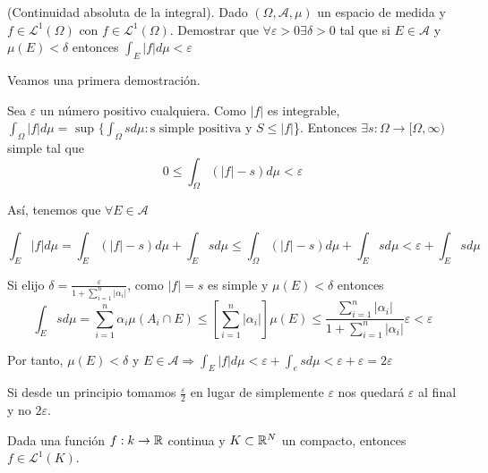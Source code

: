 \begin{ejer}
  (Continuidad absoluta de la integral). Dado $(\Omega, \mathcal A, \mu)$ un espacio de medida y $f \in \mathcal
  L^1(\Omega)$ con $f \in \mathcal L^1(\Omega)$. Demostrar que $\forall \varepsilon
  > 0 \exists \delta > 0$ tal que si $E \in \mathcal A$ y $\mu(E) < \delta$
  entonces $\int_E |f|d\mu < \varepsilon$
\end{ejer}

  \begin{sol}
    Veamos una primera demostración.

    Sea $\varepsilon$ un número positivo cualquiera. Como $|f|$ es integrable,
   $ \int_{\Omega} |f| d\mu = \text{ sup } \{ \int_{\Omega}sd\mu : \text{s
     simple positiva y } S \leq |f|$\}. Entonces $\exists s : \Omega \rightarrow
   [\Omega, \infty)$ simple tal que $$0 \leq \int_{\Omega}(|f| - s)d\mu <
   \varepsilon$$

   Así, tenemos que $\forall E \in \mathcal A$

   $$\int_E |f| d \mu = \int_E (|f| - s)d\mu + \int_E s d\mu \leq \int_{\Omega}
   (|f| -s)d\mu + \int_E s d \mu < \varepsilon + \int_E s d \mu$$

   Si elijo $\displaystyle \delta = \frac{\varepsilon}{1 + \sum_{i=1}^n |\alpha_i|}$, como $|f| =
   s$ es simple y $\mu(E) < \delta$ entonces $$\int_E sd\mu
    = \sum_{i=1}^n \alpha_i \mu (A_i \cap E) \leq \left[ \sum_{i=1}^n |\alpha_i|
    \right] \mu (E) \leq \frac{\sum_{i=1}^n |\alpha_i|}{1 + \sum_{i=1}^n
      |\alpha_i|} \varepsilon < \varepsilon $$

    Por tanto, $\mu(E) < \delta$ y $E \in \mathcal A \Rightarrow \int_E |f|d\mu
    < \varepsilon + \int_e s d \mu < \varepsilon + \varepsilon = 2\varepsilon$

    \begin{nota}
      Si desde un principio tomamos $\frac{\varepsilon}{2}$ en lugar de
    simplemente $\varepsilon$ nos quedará $\varepsilon$ al final y no $2\varepsilon$.
    \end{nota}

  \end{sol}

\begin{ejer}
  Dada una función $f: k \rightarrow \mathbb{R}$ continua y $K \subset \mathbb{R}^N$ un
  compacto, entonces $f \in \mathcal L^1(K)$.
\end{ejer}

